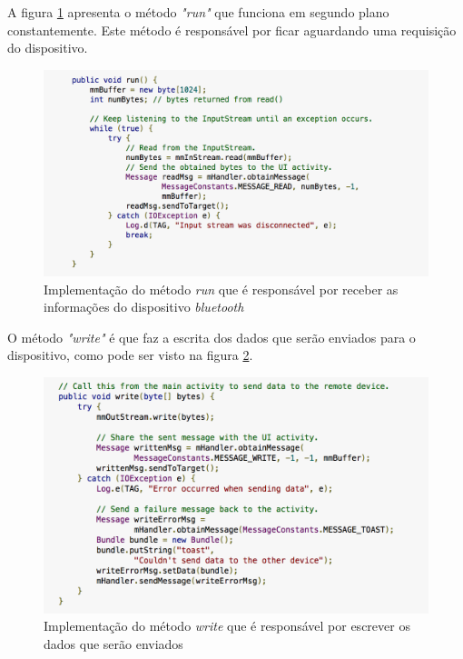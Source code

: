 A figura \ref{img:trecho3} apresenta o método \textit{"run"} que funciona em segundo plano constantemente. Este método é responsável por ficar aguardando uma requisição do dispositivo.

\graphicspath{{figuras/}}
\begin{figure}[h!]
\centering
\includegraphics[scale=0.80]{run_method}
\caption{Implementação do método \textit{run} que é responsável por receber as informações do dispositivo \textit{bluetooth}}
\label{img:trecho3}
\end{figure}

O método \textit{"write"} é que faz a escrita dos dados que serão enviados para o dispositivo, como pode ser visto na figura \ref{img:trecho4}.

\graphicspath{{figuras/}}
\begin{figure}[h!]
\centering
\includegraphics[scale=0.80]{write_method}
\caption{Implementação do método \textit{write} que é responsável por escrever os dados que serão enviados}
\label{img:trecho4}
\end{figure}

